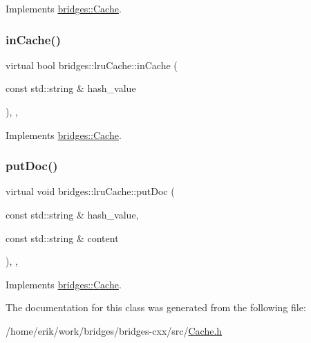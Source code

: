 Implements \hyperlink{classbridges_1_1_cache_abc1eaca36899e6e85df1c9a690f1d4dd}{bridges\+::\+Cache}.

\mbox{\label{classbridges_1_1lru_cache_ab56c75166ddcc3d17e6924e581f7a4e8}} 
\subsubsection{\texorpdfstring{in\+Cache()}{inCache()}}
{\footnotesize\ttfamily virtual bool bridges\+::lru\+Cache\+::in\+Cache (\begin{DoxyParamCaption}\item[{const std\+::string \&}]{hash\+\_\+value }\end{DoxyParamCaption})\hspace{0.3cm}{\ttfamily [inline]}, {\ttfamily [override]}, {\ttfamily [virtual]}}



Implements \hyperlink{classbridges_1_1_cache_abf3601225841d14dcd5611cd6a223ba4}{bridges\+::\+Cache}.

\mbox{\label{classbridges_1_1lru_cache_a927fa1186ba830717ce11898c2beb4c7}} 
\subsubsection{\texorpdfstring{put\+Doc()}{putDoc()}}
{\footnotesize\ttfamily virtual void bridges\+::lru\+Cache\+::put\+Doc (\begin{DoxyParamCaption}\item[{const std\+::string \&}]{hash\+\_\+value,  }\item[{const std\+::string \&}]{content }\end{DoxyParamCaption})\hspace{0.3cm}{\ttfamily [inline]}, {\ttfamily [override]}, {\ttfamily [virtual]}}



Implements \hyperlink{classbridges_1_1_cache_ae74225542568a377fdcaf0354e466954}{bridges\+::\+Cache}.



The documentation for this class was generated from the following file\+:\begin{DoxyCompactItemize}
\item 
/home/erik/work/bridges/bridges-\/cxx/src/\hyperlink{_cache_8h}{Cache.\+h}\end{DoxyCompactItemize}
